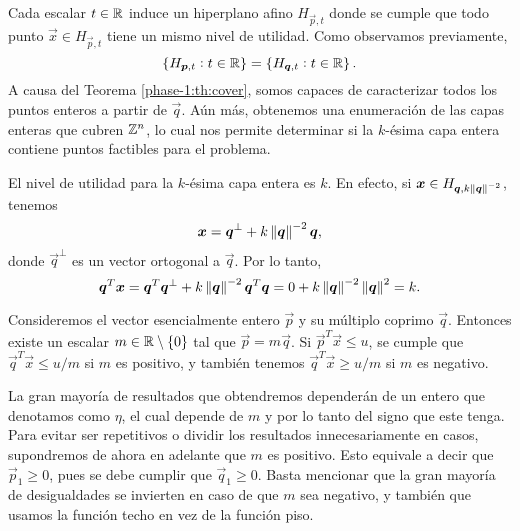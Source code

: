 Cada escalar $t \in \mathbb{R}$ induce un hiperplano afino $H_{\vec{p}, t}$ donde se cumple que todo punto
$\vec{x} \in H_{\vec{p}, t}$ tiene un mismo nivel de utilidad. Como observamos previamente,
\begin{equation*}
	\left \lbrace H_{\boldsymbol{p}, t} \vcentcolon t \in \mathbb{R} \right\rbrace
	=
	\left \lbrace H_{\boldsymbol{q}, t} \vcentcolon t \in \mathbb{R} \right\rbrace.
\end{equation*}
A causa del Teorema \ref{phase-1:th:cover}, somos capaces de caracterizar todos los puntos enteros a
partir de $\vec{q}$. Aún más, obtenemos una enumeración de las capas enteras que cubren $\mathbb{Z}^n$, lo
cual nos permite determinar si la $k$-ésima capa entera contiene puntos factibles para el problema.

El nivel de utilidad para la $k$-ésima capa entera es $k$. En efecto, si $\boldsymbol{x} \in H_{\boldsymbol{q},
k\left\lVert \boldsymbol{q} \right\rVert^{-2}}$, tenemos
\begin{equation*}
	\boldsymbol{x} = \boldsymbol{q}^{\perp} + k\left\lVert \boldsymbol{q} \right\rVert^{-2}\boldsymbol{q},
\end{equation*}
donde $\vec{q}^{\perp}$ es un vector ortogonal a $\vec{q}$. Por lo tanto,
\begin{equation*}
	\boldsymbol{q}^T\boldsymbol{x} = \boldsymbol{q}^T\boldsymbol{q}^{\perp} + k\left\lVert \boldsymbol{q} \right\rVert^{-2}\boldsymbol{q}^T\boldsymbol{q}
	= 0 + k \left\lVert \boldsymbol{q} \right\rVert^{-2} \left\lVert \boldsymbol{q} \right\rVert^{2} = k.
\end{equation*}

Consideremos el vector esencialmente entero $\vec{p}$ y su múltiplo coprimo $\vec{q}$. Entonces
existe un escalar $m \in \mathbb{R} \setminus \lbrace 0 \rbrace$ tal que $\vec{p} = m\vec{q}$. Si
$\vec{p}^T\vec{x} \leq u$, se cumple que $\vec{q}^T\vec{x} \leq u/m$ si $m$ es positivo, y también
tenemos $\vec{q}^T\vec{x} \geq u/m$ si $m$ es negativo.

La gran mayoría de resultados que obtendremos dependerán de un entero que denotamos como $\eta$, el
cual depende de $m$ y por lo tanto del signo que este tenga. Para evitar ser repetitivos o dividir
los resultados innecesariamente en casos, supondremos de ahora en adelante que $m$ es positivo. Esto
equivale a decir que $\vec{p}_1 \geq 0$, pues se debe cumplir que $\vec{q}_1 \geq 0$. Basta
mencionar que la gran mayoría de desigualdades se invierten en caso de que $m$ sea negativo, y
también que usamos la función techo en vez de la función piso.

